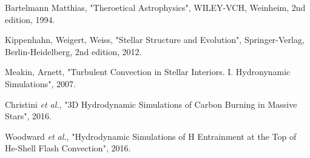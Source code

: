 

\begin{thebibliography}{9}

		  Bartelmann Matthias,
		  "Theroetical Astrophysics",
		      WILEY-VCH, Weinheim,
		        2nd edition,
			  1994.
	
		  Kippenhahn, Weigert, Weiss,
		  "Stellar Structure and Evolution",
		      Springer-Verlag, Berlin-Heidelberg,
		        2nd edition,
			  2012.

		  Meakin, Arnett,
		  "Turbulent Convection in Stellar Interiors. I. Hydronynamic Simulations",
			  2007.

		Christini \emph{et al.},
		  "3D Hydrodynamic Simulations of Carbon Burning in Massive Stars",
			  2016.

		Woodward \emph{et al.},
		  "Hydrodynamic Simulations of H Entrainment at the Top of He-Shell Flash Convection",
			  2016.
\end{thebibliography}

